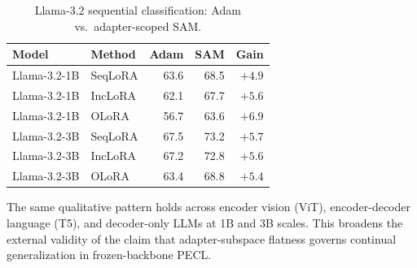 \begin{table}[h]
\centering
\caption{Llama-3.2 sequential classification: Adam vs.\ adapter-scoped SAM.}
\label{tab:llama_results}
\footnotesize
\setlength{\tabcolsep}{4pt}
\begin{tabular}{@{}l l r r r@{}}
\toprule
\textbf{Model} & \textbf{Method} & \textbf{Adam} & \textbf{SAM} & \textbf{Gain} \\
\midrule
Llama-3.2-1B & SeqLoRA & 63.6 & 68.5 & $+4.9$ \\
Llama-3.2-1B & IncLoRA & 62.1 & 67.7 & $+5.6$ \\
Llama-3.2-1B & OLoRA   & 56.7 & 63.6 & $+6.9$ \\
Llama-3.2-3B & SeqLoRA & 67.5 & 73.2 & $+5.7$ \\
Llama-3.2-3B & IncLoRA & 67.2 & 72.8 & $+5.6$ \\
Llama-3.2-3B & OLoRA   & 63.4 & 68.8 & $+5.4$ \\
\bottomrule
\end{tabular}
\end{table}

The same qualitative pattern holds across encoder vision (ViT), encoder-decoder language (T5), and decoder-only LLMs at 1B and 3B scales.
This broadens the external validity of the claim that adapter-subspace flatness governs continual generalization in frozen-backbone PECL.
